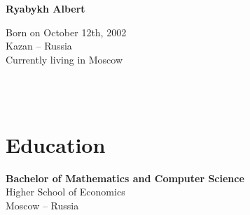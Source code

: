 \documentclass[a4paper,6pt]{article}
\begin{document}
\thispagestyle{empty}

\begin{adjustbox}{valign=t}
\begin{minipage}{0.3\textwidth} %
\begin{center}

\MySkip 	%

{\LARGE \bfseries Ryabykh Albert}

\MySkip 	%

Born on October 12th, 2002\\
Kazan -- Russia\\
Currently living in Moscow\\

\MySkip 	%

\textcolor{ColorTwo}{\faEnvelopeO} 
 \\
 \\

\end{center}

\vfill

\section*{Education}
	\begin{description}
	\raggedright
	\item [\normalfont \textcolor{ColorOne}{Sep 2020 --- Jul 2024}] \textbf{Bachelor of Mathematics and Computer Science} \\
	Higher School of Economics\\
	Moscow -- Russia
\end{description}

\vfill
\end{minipage}
\end{adjustbox}
%
%
\end{document}
